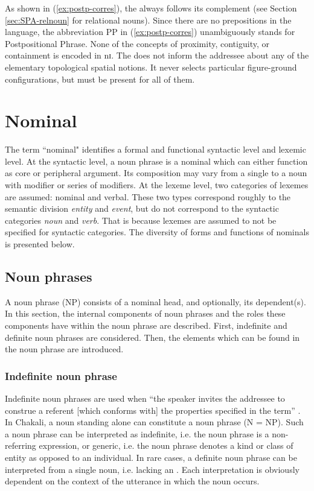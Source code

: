 \begin{exe}
\begin{exe}
\begin{exe}
\z
\z


As shown  in (\ref{ex:postp-corres}), the   always follows its complement (see Section 
\ref{sec:SPA-relnoun} for relational nouns). Since there are no prepositions in the 
language, the abbreviation PP in (\ref{ex:postp-corres}) unambiguously stands for Postpositional Phrase. None of the concepts of proximity, 
contiguity, or containment is encoded in   {\sls nɪ}. The  does not 
inform the addressee about any of the 
elementary topological spatial notions. It never 
selects particular figure-ground configurations, but must be present for all of 
them. 


\section{Nominal}
\label{sec:GRM-nom}


The term ``nominal"  identifies  a formal and functional  syntactic level and
lexemic level. At the syntactic level, a noun phrase is a nominal  which can
either function as core or peripheral argument.  Its composition may
vary from a single  to a noun with modifier or series of
modifiers. At the lexeme level, two categories of lexemes are assumed:
nominal and verbal. These two types correspond roughly to the semantic division
{\it entity} and {\it event}, but do not correspond to the syntactic categories
{\it noun} and {\it verb}. That is because lexemes are assumed to not be
specified for syntactic categories. The diversity  of forms and functions of
nominals is presented below. 


\subsection{Noun phrases}
\label{sec:GRM-noun-phrases}

A noun phrase (NP)  consists of a nominal head, and optionally, its dependent(s).
In this section,  the internal components of noun phrases and the roles these
components have within the noun phrase are described. First,   indefinite and
definite noun phrases are considered. Then, the elements which can be found in
the noun phrase are introduced. 

\subsubsection{Indefinite noun phrase}
\label{sec:GRM-np-indef}

Indefinite noun phrases are used when ``the speaker invites the addressee to 
construe a referent [which conforms with] the properties specified in the term'' 
\citep[184]{Dik97}.  In Chakali, a noun standing alone can  constitute a noun 
phrase (N = NP). Such a noun phrase can be interpreted as indefinite, i.e. the 
noun phrase is a non-referring expression,  or   generic,  i.e. the noun phrase 
denotes  a kind or class of entity  as opposed to an individual.  In rare cases, 
a definite noun phrase can be interpreted from a single noun, i.e. lacking  an 
. Each interpretation is obviously dependent on the context of the 
utterance in which the noun occurs.


\end{exe}
\end{exe}
\end{exe}
